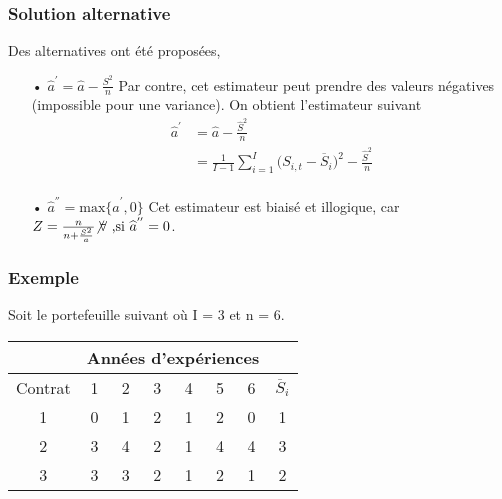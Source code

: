 \subsubsection*{Solution alternative}
Des alternatives ont été proposées,
\begin{itemize}
\item[•] $\widehat{a}^{'} = \widehat{a} - \frac{S^2}{n}$ Par contre, cet estimateur peut prendre des valeurs négatives (impossible pour une variance). On obtient l'estimateur suivant 
\begin{align*}
\widehat{a}^{'} &= \widehat{a} - \frac{\widehat{S}^2}{n} \\
&= \frac{1}{I-1} \sum_{i=1}^{I} \big( S_{i,t} -\overline{S}_i \big)^2 - \frac{\widehat{S}^2}{n} \\
\end{align*}
\item[•] $\widehat{a}^{''} = \text{max}\lbrace \widehat{a}^{'}, 0 \rbrace$ Cet estimateur est biaisé et illogique, car $Z = \frac{n}{n + \frac{S^2}{a}} {\not\forall}  \text{ ,si } \widehat{a}^{''} = 0 $.
\end{itemize}

\subsubsection*{Exemple}
Soit le portefeuille suivant où I = 3 et n = 6.


\begin{tabular}{|c|c|c|c|c|c|c|c|}
  \hline
   & \multicolumn{6}{c|}{Années d'expériences} & \\
  \hline
  Contrat & 1 & 2 & 3 & 4 & 5 & 6 & $\overline{S}_i$ \\
  \hline
  1 & 0 & 1 & 2 & 1 & 2 & 0 & 1\\
  2 & 3 & 4 & 2 & 1 & 4 & 4 & 3\\
  3 & 3 & 3 & 2 & 1 & 2 & 1 & 2\\
  \hline
\end{tabular}

